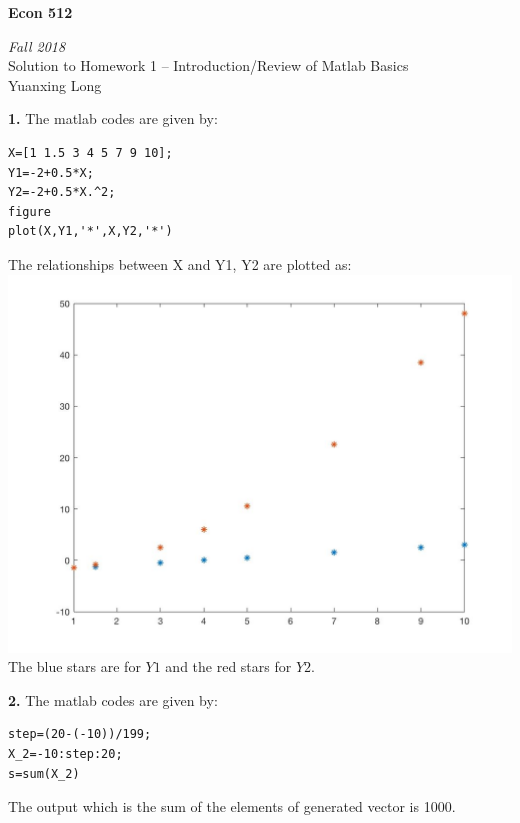 \documentclass[10pt]{article}
\begin{document}
\begin{center}
\textbf{Econ 512}

\emph{Fall 2018}\\[1em]

Solution to Homework 1 -- Introduction/Review of Matlab Basics\\
Yuanxing Long\\
\end{center}

\bigskip 

\noindent
\textbf{1.} The matlab codes are given by: 
\begin{lstlisting}
X=[1 1.5 3 4 5 7 9 10];
Y1=-2+0.5*X;
Y2=-2+0.5*X.^2;
figure
plot(X,Y1,'*',X,Y2,'*')
\end{lstlisting}
The relationships between X and Y1, Y2 are plotted as: \\
 \includegraphics[scale=0.2]{hw1q1.jpg}\\ 
 The blue stars are for $Y1$ and the red stars for $Y2$.


\bigskip 

\noindent
\textbf{2.} The matlab codes are given by: 
\begin{lstlisting}
step=(20-(-10))/199;
X_2=-10:step:20;
s=sum(X_2)
\end{lstlisting}
The output which is the sum of the elements of generated vector is 1000.\\



\bigskip 
\end{document}
